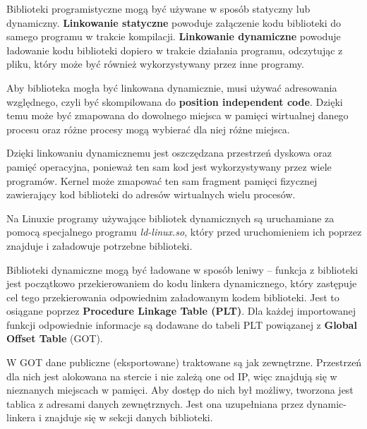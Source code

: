 Biblioteki programistyczne mogą być używane w sposób statyczny lub dynamiczny. \textbf{Linkowanie statyczne} powoduje załączenie kodu biblioteki do samego programu w trakcie kompilacji. \textbf{Linkowanie dynamiczne} powoduje ładowanie kodu biblioteki dopiero w trakcie działania programu, odczytując z pliku, który może być również wykorzystywany przez inne programy.

Aby biblioteka mogła być linkowana dynamicznie, musi używać adresowania względnego, czyli być skompilowana do \textbf{position independent code}. Dzięki temu może być zmapowana do dowolnego miejsca w pamięci wirtualnej danego procesu oraz różne procesy mogą wybierać dla niej różne miejsca.

Dzięki linkowaniu dynamicznemu jest oszczędzana przestrzeń dyskowa oraz pamięć operacyjna, ponieważ ten sam kod jest wykorzystywany przez wiele programów. Kernel może zmapować ten sam fragment pamięci fizycznej zawierający kod biblioteki do adresów wirtualnych wielu procesów.

Na Linuxie programy używające bibliotek dynamicznych są uruchamiane za pomocą specjalnego programu \textit{ld-linux.so}, który przed uruchomieniem ich poprzez znajduje i załadowuje potrzebne biblioteki.

Biblioteki dynamiczne mogą być ładowane w sposób leniwy -- funkcja z biblioteki jest początkowo przekierowaniem do kodu linkera dynamicznego, który zastępuje cel tego przekierowania odpowiednim załadowanym kodem biblioteki. Jest to osiągane poprzez \textbf{Procedure Linkage Table (PLT)}. Dla każdej importowanej funkcji odpowiednie informacje są dodawane do tabeli PLT powiązanej z \textbf{Global Offset Table} (GOT). 

W GOT dane publiczne (eksportowane) traktowane są jak zewnętrzne. Przestrzeń dla nich jest alokowana na stercie i nie zależą one od IP, więc znajdują się w nieznanych miejscach w pamięci. Aby dostęp do nich był możliwy, tworzona jest tablica z adresami danych zewnętrznych. Jest ona uzupełniana przez dynamic-linkera i znajduje się w sekcji danych biblioteki.